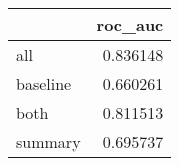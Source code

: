 \begin{tabular}{lr}
\toprule
{} &   roc\_auc \\
\midrule
all      &  0.836148 \\
baseline &  0.660261 \\
both     &  0.811513 \\
summary  &  0.695737 \\
\bottomrule
\end{tabular}
